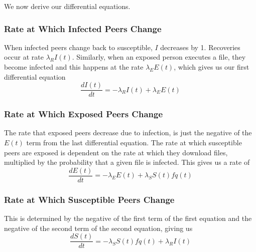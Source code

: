 \documentclass[12pt, oneside]{article}
\begin{document}
        We now derive our differential equations.
        \subsubsection{Rate at Which Infected Peers Change}
        When infected peers change back to susceptible,  $I$ decreases by 1. Recoveries occur at rate  $\lambda_R I(t)$.
        Similarly, when an exposed person executes a file, they become infected and this happens at the rate $\lambda_E E(t)$, which
        gives us our first differential equation \[
        \frac{dI(t)}{dt}=-\lambda_R I(t)+\lambda_E E(t)
        \] 
        \subsubsection{Rate at Which Exposed Peers Change}
        The rate that exposed peers decrease due to infection, is just the negative of the $E(t)$ term from the last differential equation.
        The rate at which susceptible peers are exposed is dependent on the rate at which they download files, multiplied by the probability
        that a given file is infected. This gives us a rate of \[
            \frac{dE(t)}{dt}=-\lambda_E E(t)+\lambda_S S(t)f{q(t)}
        \]
        \subsubsection{Rate at Which Susceptible Peers Change}
        This is determined by the negative of the first term of the first equation and the negative of the second term of the second equation, giving us
        \[
            \frac{dS(t)}{dt}=-\lambda_S S(t)f{q(t)}+\lambda_R I(t)
        \]





\end{document}
